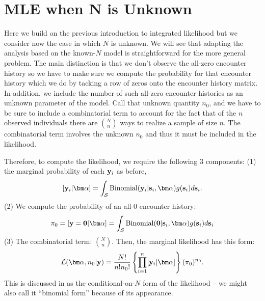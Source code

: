 

\section{MLE when N is Unknown} 
\label{mle.sec.Nunknown}

Here we build on the previous introduction to integrated likelihood
but we consider now the case in which $N$ is unknown. We will see that
adapting the analysis based on the known-$N$ model is 
straightforward for the more general problem. The main distinction is
that we don't observe the all-zero encounter history so we have to
make sure we compute the probability for that encounter history which
we do by tacking a row of zeros onto the encounter history matrix. In
addition, we include the number of such all-zero encounter histories
as an unknown parameter of the model. Call that unknown quantity
$n_{0}$, and we have to be sure to include a combinatorial term to
account for the fact that of the $n$ observed individuals there are
${N \choose n}$ ways to realize a sample of size $n$. The
combinatorial term involves the unknown $n_{0}$ and thus it must be
included in the likelihood.

Therefore, to compute the likelihood, we require 
the following 3 components: (1) the marginal
probability of each ${\bf y}_{i}$ as before,
\[
  [{\bf y}_{i}|{\bm \alpha}] = 
\int_{{\cal S}} \mbox{Binomial}({\bf y}_{i} |{\bf s}_{i}, {\bm \alpha})g({\bf s}_{i}) d{\bf s}_{i}.
\]
(2) We compute
the probability of an all-0 encounter history:
\[
\pi_{0} = [{\bf y} = {\bf 0} | {\bm \alpha}] = 
\int_{{\cal S}} \mbox{Binomial}({\bf 0} |{\bf s}_{i}, {\bm \alpha})g({\bf s}_{i}) d{\bf s}_{i}
\]
(3) The combinatorial term: ${N \choose n}$. Then, 
 the marginal likelihood has this form:
\begin{equation}
 {\cal L}({\bm \alpha}, n_{0}| {\bf y})  = \frac{N!}{n! n_{0}!}
 \left\{ \prod_{i=1}^{n}  [{\bf y}_{i}|{\bm \alpha}] \right\}
 (\pi_{0})^{n_{0}}.
\label{mle.eq.binomialform}
\end{equation}
This is discussed in \citet[][p. 379]{borchers_efford:2008} as the
conditional-on-$N$ form of the likelihood -- we might also call it
``binomial form'' because of its appearance. 

